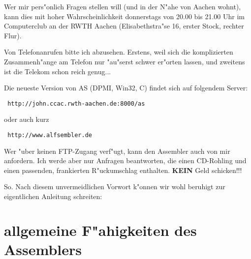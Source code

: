 \documentclass[12pt,a4paper,twoside]{report}
\newcommand{\bb}[1]{{\bf #1}}
\begin{document}
Wer mir pers"onlich Fragen stellen will (und in der N"ahe von Aachen
wohnt), kann dies mit hoher Wahrscheinlichkeit donnerstags von 20.00
bis 21.00 Uhr im Computerclub an der RWTH Aachen (Elisabethstra"se 16,
erster Stock, rechter Flur).
\par
Von Telefonanrufen bitte ich abzusehen.  Erstens, weil sich die
komplizierten Zusammenh"ange am Telefon nur "au"serst schwer er"orten
lassen, und zweitens ist die Telekom schon reich genug...
\par
Die neueste Version von AS (DPMI, Win32, C) findet sich auf folgendem
Server:
\begin{verbatim}
 http://john.ccac.rwth-aachen.de:8000/as
\end{verbatim}
oder auch kurz
\begin{verbatim}
 http://www.alfsembler.de
\end{verbatim}
\par
Wer "uber keinen FTP-Zugang verf"ugt, kann den Assembler auch von mir
anfordern.  Ich werde aber nur Anfragen beantworten, die einen CD-Rohling
und einen passenden, frankierten R"uckumschlag enthalten.  \bb{KEIN} Geld
schicken!!!
\par
So. Nach diesem unvermeidlichen Vorwort k"onnen wir wohl beruhigt
zur eigentlichen Anleitung schreiten:


\section{allgemeine F"ahigkeiten des Assemblers}
\end{document}
